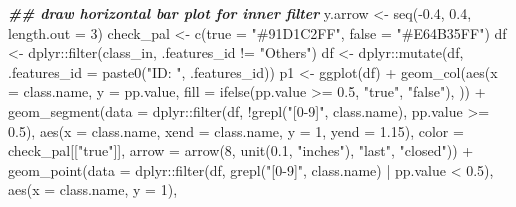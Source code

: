 \documentclass[
]{article}
\newenvironment{Shaded}{\begin{snugshade}}{\end{snugshade}}
\newcommand{\AttributeTok}[1]{\textcolor[rgb]{0.77,0.63,0.00}{#1}}
\newcommand{\DecValTok}[1]{\textcolor[rgb]{0.00,0.00,0.81}{#1}}
\newcommand{\DocumentationTok}[1]{\textcolor[rgb]{0.56,0.35,0.01}{\textbf{\textit{#1}}}}
\newcommand{\FloatTok}[1]{\textcolor[rgb]{0.00,0.00,0.81}{#1}}
\newcommand{\FunctionTok}[1]{\textcolor[rgb]{0.00,0.00,0.00}{#1}}
\newcommand{\NormalTok}[1]{#1}
\newcommand{\OtherTok}[1]{\textcolor[rgb]{0.56,0.35,0.01}{#1}}
\newcommand{\SpecialCharTok}[1]{\textcolor[rgb]{0.00,0.00,0.00}{#1}}
\newcommand{\StringTok}[1]{\textcolor[rgb]{0.31,0.60,0.02}{#1}}
\begin{document}
\begin{Shaded}
\begin{Highlighting}[]
\DocumentationTok{\#\# draw horizontal bar plot for inner filter}
\NormalTok{y.arrow }\OtherTok{\textless{}{-}} \FunctionTok{seq}\NormalTok{(}\SpecialCharTok{{-}}\FloatTok{0.4}\NormalTok{, }\FloatTok{0.4}\NormalTok{, }\AttributeTok{length.out =} \DecValTok{3}\NormalTok{)}
\NormalTok{check\_pal }\OtherTok{\textless{}{-}} \FunctionTok{c}\NormalTok{(}\AttributeTok{true =} \StringTok{"\#91D1C2FF"}\NormalTok{, }\AttributeTok{false =} \StringTok{"\#E64B35FF"}\NormalTok{)}
\NormalTok{df }\OtherTok{\textless{}{-}}\NormalTok{ dplyr}\SpecialCharTok{::}\FunctionTok{filter}\NormalTok{(class\_in, .features\_id }\SpecialCharTok{!=} \StringTok{"Others"}\NormalTok{)}
\NormalTok{df }\OtherTok{\textless{}{-}}\NormalTok{ dplyr}\SpecialCharTok{::}\FunctionTok{mutate}\NormalTok{(df, }\AttributeTok{.features\_id =} \FunctionTok{paste0}\NormalTok{(}\StringTok{"ID: "}\NormalTok{, .features\_id))}
\NormalTok{p1 }\OtherTok{\textless{}{-}} \FunctionTok{ggplot}\NormalTok{(df) }\SpecialCharTok{+}
  \FunctionTok{geom\_col}\NormalTok{(}\FunctionTok{aes}\NormalTok{(}\AttributeTok{x =}\NormalTok{ class.name, }\AttributeTok{y =}\NormalTok{ pp.value,}
      \AttributeTok{fill =} \FunctionTok{ifelse}\NormalTok{(pp.value }\SpecialCharTok{\textgreater{}=} \FloatTok{0.5}\NormalTok{, }\StringTok{"true"}\NormalTok{, }\StringTok{"false"}\NormalTok{),}
\NormalTok{      )) }\SpecialCharTok{+}
  \FunctionTok{geom\_segment}\NormalTok{(}\AttributeTok{data =}\NormalTok{ dplyr}\SpecialCharTok{::}\FunctionTok{filter}\NormalTok{(df, }\SpecialCharTok{!}\FunctionTok{grepl}\NormalTok{(}\StringTok{"[0{-}9]"}\NormalTok{, class.name), pp.value }\SpecialCharTok{\textgreater{}=} \FloatTok{0.5}\NormalTok{),}
    \FunctionTok{aes}\NormalTok{(}\AttributeTok{x =}\NormalTok{ class.name, }\AttributeTok{xend =}\NormalTok{ class.name, }\AttributeTok{y =} \DecValTok{1}\NormalTok{, }\AttributeTok{yend =} \FloatTok{1.15}\NormalTok{),}
    \AttributeTok{color =}\NormalTok{ check\_pal[[}\StringTok{"true"}\NormalTok{]],}
    \AttributeTok{arrow =} \FunctionTok{arrow}\NormalTok{(}\DecValTok{8}\NormalTok{, }\FunctionTok{unit}\NormalTok{(}\FloatTok{0.1}\NormalTok{, }\StringTok{"inches"}\NormalTok{), }\StringTok{"last"}\NormalTok{, }\StringTok{"closed"}\NormalTok{)) }\SpecialCharTok{+}
  \FunctionTok{geom\_point}\NormalTok{(}\AttributeTok{data =}\NormalTok{ dplyr}\SpecialCharTok{::}\FunctionTok{filter}\NormalTok{(df, }\FunctionTok{grepl}\NormalTok{(}\StringTok{"[0{-}9]"}\NormalTok{, class.name) }\SpecialCharTok{|}\NormalTok{ pp.value }\SpecialCharTok{\textless{}} \FloatTok{0.5}\NormalTok{),}
    \FunctionTok{aes}\NormalTok{(}\AttributeTok{x =}\NormalTok{ class.name, }\AttributeTok{y =} \DecValTok{1}\NormalTok{),}

\end{Highlighting}
\end{Shaded}
\end{document}
